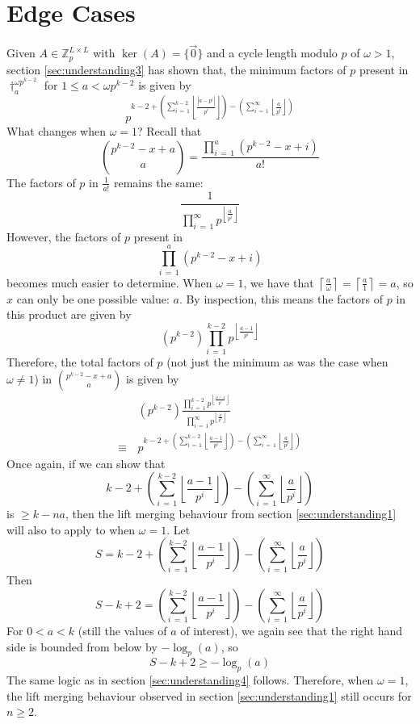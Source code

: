 \documentclass[a4paper, 12pt, reqno]{amsart}
\newcommand\ceil[1]{\left\lceil #1 \right\rceil}
\newcommand\floor[1]{\left\lfloor #1 \right\rfloor}
\begin{document}
	\section{Edge Cases}
		Given $A \in \mathds{Z}_p^{L \times L}$ with $\ker(A) = \{\vec{0}\}$ and a cycle length modulo $p$ of $\omega > 1$, section \ref{sec:understanding3} has shown that, 
		the minimum factors of $p$ present in $\dag_a^{\omega p^{k-2}}$ for $1 \leq a < \omega p^{k-2}$ is given by
		\[
			p^{k-2 + \left(\sum_{i\,=\,1}^{k-2} \floor{\frac{|a-p^i|}{p^i}} \right) - \left(\sum_{i\,=\,1}^\infty \floor{\frac{a}{p^i}} \right)}
		\]
		What changes when $\omega = 1$? Recall that
		\[
			\binom{p^{k-2}-x+a}{a} = \frac{\prod_{i\,=\,1}^a (p^{k-2}-x+i)}{a!}
		\]
		The factors of $p$ in $\frac{1}{a!}$ remains the same:
		\[
			\frac{1}{\prod_{i\,=\,1}^\infty p^{\floor{\frac{a}{p^i}}}}
		\]
		However, the factors of $p$ present in
		\[
			\prod_{i\,=\,1}^a (p^{k-2}-x+i)
		\]
		becomes much easier to determine. When $\omega = 1$, we have that $\ceil{\frac{a}{\omega}} = \ceil{\frac{a}{1}} = a$, so $x$ can only be one possible value: $a$.
		By inspection, this means the factors of $p$ in this product are given by
		\[
			(p^{k-2})\prod_{i\,=\,1}^{k-2} p^{\floor{\frac{a-1}{p^i}}}
		\]
		Therefore, the total factors of $p$ (not just the minimum as was the case when $\omega \neq 1$) in $\binom{p^{k-2}-x+a}{a}$ is given by
		\begin{align*}
			      &\, (p^{k-2})\frac{\prod_{i\,=\,1}^{k-2} p^{\floor{\frac{a-1}{p^i}}}}{\prod_{i\,=\,1}^\infty p^{\floor{\frac{a}{p^i}}}} \\
			\equiv&\, p^{k-2+\left(\sum_{i\,=\,1}^{k-2} \floor{\frac{a-1}{p^i}}\right) - \left(\sum_{i\,=\,1}^\infty \floor{\frac{a}{p^i}}\right)}
		\end{align*}
		Once again, if we can show that
		\[
			k-2+\left(\sum_{i\,=\,1}^{k-2} \floor{\frac{a-1}{p^i}}\right) - \left(\sum_{i\,=\,1}^\infty \floor{\frac{a}{p^i}}\right)
		\]
		is $\geq k - na$, then the lift merging behaviour from section \ref{sec:understanding1} will also to apply to when $\omega = 1$. Let
		\[
			S = k-2+\left(\sum_{i\,=\,1}^{k-2} \floor{\frac{a-1}{p^i}}\right) - \left(\sum_{i\,=\,1}^\infty \floor{\frac{a}{p^i}}\right)
		\]
		Then
		\[
			S-k+2 = \left(\sum_{i\,=\,1}^{k-2} \floor{\frac{a-1}{p^i}}\right) - \left(\sum_{i\,=\,1}^\infty \floor{\frac{a}{p^i}}\right)
		\]
		For $0 < a < k$ (still the values of $a$ of interest), we again see that the right hand side is bounded from below by $-\log_p(a)$, so
		\[
			S-k+2 \geq -\log_p(a)
		\]
		The same logic as in section \ref{sec:understanding4} follows. Therefore, when $\omega = 1$, the lift merging behaviour observed in section \ref{sec:understanding1}
		still occurs for $n \geq 2$.
		
\end{document}
